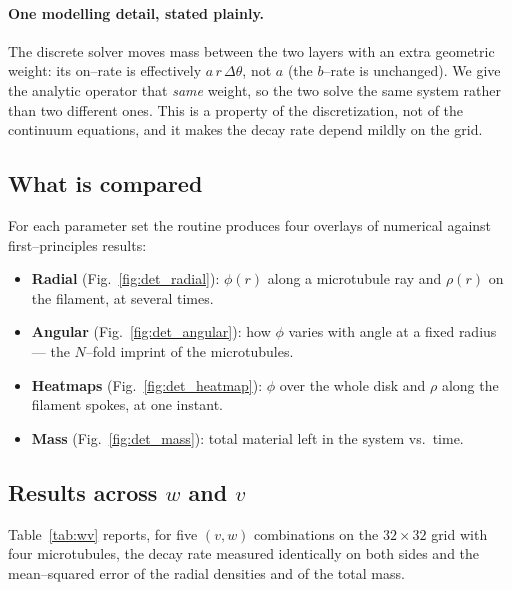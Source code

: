 \documentclass{article}
\begin{document}
\paragraph{One modelling detail, stated plainly.} The discrete solver moves mass
between the two layers with an extra geometric weight: its on--rate is effectively
$a\,r\,\Delta\theta$, not $a$ (the $b$--rate is unchanged). We give the analytic
operator that \emph{same} weight, so the two solve the same system rather than two
different ones. This is a property of the discretization, not of the continuum
equations, and it makes the decay rate depend mildly on the grid.

\subsection{What is compared}

For each parameter set the routine produces four overlays of numerical against
first--principles results:
\begin{itemize}
\item \textbf{Radial} (Fig.~\ref{fig:det_radial}): $\phi(r)$ along a microtubule
ray and $\rho(r)$ on the filament, at several times.
\item \textbf{Angular} (Fig.~\ref{fig:det_angular}): how $\phi$ varies with angle
at a fixed radius --- the $N$--fold imprint of the microtubules.
\item \textbf{Heatmaps} (Fig.~\ref{fig:det_heatmap}): $\phi$ over the whole disk
and $\rho$ along the filament spokes, at one instant.
\item \textbf{Mass} (Fig.~\ref{fig:det_mass}): total material left in the system
vs.\ time.
\end{itemize}

\subsection{Results across $w$ and $v$}

Table~\ref{tab:wv} reports, for five $(v,w)$ combinations on the $32\times32$
grid with four microtubules, the decay rate measured identically on both sides
and the mean--squared error of the radial densities and of the total mass.
\end{document}
